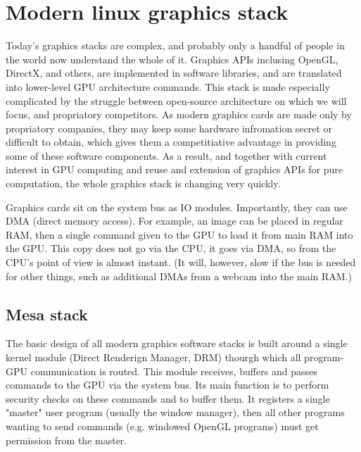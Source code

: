 \documentclass[oneside,english]{scrbook}
\begin{document}
\section{Modern linux graphics stack}


Today's graphics stacks are complex, and probably only a handful of people in the world now understand the whole of it. Graphics APIs inclusing OpenGL, DirectX, and others, are implemented in software libraries, and are translated into lower-level GPU architecture commands.   This stack is made especially complicated by the struggle between open-source architecture on which we will focus, and propriatory competitors.  As modern graphics cards are made only by propriatory companies, they may keep some hardware infromation secret or difficult to obtain, which gives them a competitiative advantage in providing some of these software components.  As a result, and together with current interest in GPU computing and reuse and extension of graphics APIs for pure computation, the whole graphics stack is changing very quickly.

Graphics cards sit on the system bus as IO modules.  Importantly, they can use DMA (direct memory access).  For example, an image can be placed in regular RAM, then a single command given to the GPU to load it from main RAM into the GPU.  This copy does not go via the CPU, it goes via DMA, so from the CPU's point of view is almost instant.  (It will, however, slow if the bus is needed for other things, such as additional DMAs from a webcam into the main RAM.)

\subsection{Mesa stack}

The basic design of all modern graphics software stacks is built around a single kernel module (Direct Renderign Manager, DRM) thourgh which all program-GPU communication is routed. This module receives, buffers and passes commands to the GPU via the system bus. Its main function is to perform security checks on these commands and to buffer them.  It registers a single "master" user program (usually the window manager), then all other programs wanting to send commands (e.g. windowed OpenGL programs) must get permission from the master.    
\end{document}
